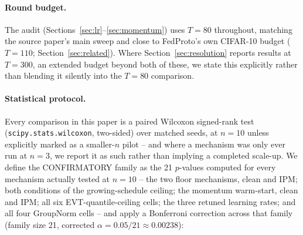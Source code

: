 \documentclass{article}
\begin{document}
\paragraph{Round budget.} The audit (Sections~\ref{sec:lr}--\ref{sec:momentum})
uses $T{=}80$ throughout, matching the source paper's main sweep and close to
FedProto's own CIFAR-10 budget ($T{=}110$; Section~\ref{sec:related}). Where
Section~\ref{sec:resolution} reports results at $T{=}300$, an extended budget
beyond both of these, we state this explicitly rather than blending it silently
into the $T{=}80$ comparison.

\paragraph{Statistical protocol.} Every comparison in this paper is a paired
Wilcoxon signed-rank test (\texttt{scipy.stats.wilcoxon}, two-sided) over matched
seeds, at $n{=}10$ unless explicitly marked as a smaller-$n$ pilot -- and where a
mechanism was only ever run at $n{=}3$, we report it as such rather than implying
a completed scale-up. We define the CONFIRMATORY family as the 21 $p$-values
computed for every mechanism actually tested at $n{=}10$ -- the two floor
mechanisms, clean and IPM; both conditions of the growing-schedule ceiling; the
momentum warm-start, clean and IPM; all six EVT-quantile-ceiling cells; the
three retuned learning rates; and all four GroupNorm cells -- and apply a
Bonferroni correction across that family (family size 21, corrected
$\alpha{=}0.05/21{\approx}0.00238$):
\end{document}
